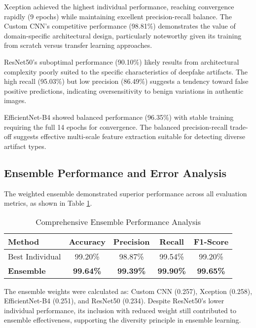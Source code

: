 \documentclass[conference]{IEEEtran}
\begin{document}
Xception achieved the highest individual performance, reaching convergence rapidly (9 epochs) while maintaining excellent precision-recall balance. The Custom CNN's competitive performance (98.81\%) demonstrates the value of domain-specific architectural design, particularly noteworthy given its training from scratch versus transfer learning approaches.

ResNet50's suboptimal performance (90.10\%) likely results from architectural complexity poorly suited to the specific characteristics of deepfake artifacts. The high recall (95.03\%) but low precision (86.49\%) suggests a tendency toward false positive predictions, indicating oversensitivity to benign variations in authentic images.

EfficientNet-B4 showed balanced performance (96.35\%) with stable training requiring the full 14 epochs for convergence. The balanced precision-recall trade-off suggests effective multi-scale feature extraction suitable for detecting diverse artifact types.

\subsection{Ensemble Performance and Error Analysis}

The weighted ensemble demonstrated superior performance across all evaluation metrics, as shown in Table \ref{tab:comprehensive_ensemble_results}.

\begin{table}[htbp]
\caption{Comprehensive Ensemble Performance Analysis}
\begin{center}
\begin{tabular}{lcccc}
\toprule
\textbf{Method} & \textbf{Accuracy} & \textbf{Precision} & \textbf{Recall} & \textbf{F1-Score} \\
\midrule
Best Individual & 99.20\% & 98.87\% & 99.54\% & 99.20\% \\
\textbf{Ensemble} & \textbf{99.64\%} & \textbf{99.39\%} & \textbf{99.90\%} & \textbf{99.65\%} \\
\midrule

\end{tabular}
\label{tab:comprehensive_ensemble_results}
\end{center}
\end{table}

The ensemble weights were calculated as: Custom CNN (0.257), Xception (0.258), EfficientNet-B4 (0.251), and ResNet50 (0.234). Despite ResNet50's lower individual performance, its inclusion with reduced weight still contributed to ensemble effectiveness, supporting the diversity principle in ensemble learning.
\end{document}
